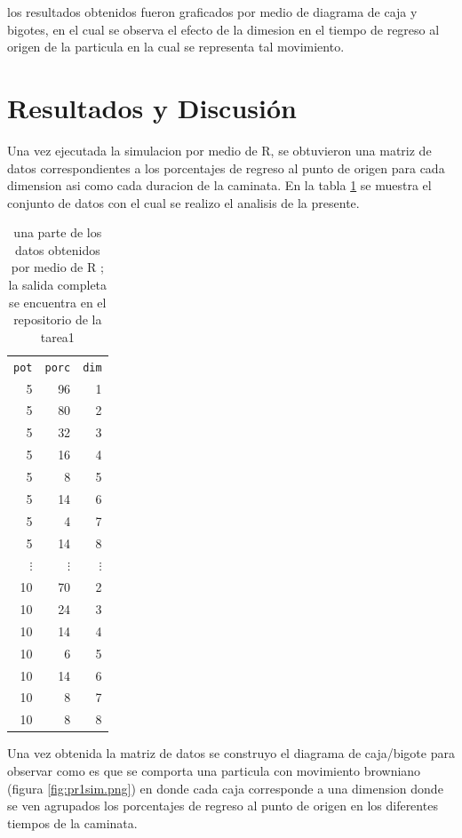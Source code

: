 \documentclass{article}
\begin{document}
los resultados obtenidos fueron graficados por medio de diagrama de caja y bigotes, en el cual se observa el efecto de la dimesion en el tiempo de regreso al origen de la particula en la cual se representa tal movimiento.

\section{Resultados y Discusi\'on}\label{res}

Una vez ejecutada la simulacion por medio de R, se obtuvieron una matriz de datos correspondientes a los porcentajes de regreso al punto de origen para cada dimension asi como cada duracion de la caminata. En la tabla \ref{t1} se muestra el conjunto de datos con el cual se realizo el analisis de la presente.

\begin{table} 
\caption{una parte de los datos obtenidos por medio de R ; la salida completa se encuentra en el repositorio de la tarea1}
\label{t1}
\begin{center}
\begin{tabular}{rrr}
\texttt{pot} & \texttt{porc} & \texttt{dim} \\
5  &  96  &  1 \\
5  &  80  &  2 \\
5  &  32  &  3 \\
5  &  16  &  4 \\
5  &  8    &   5 \\
5  &  14  &   6 \\
5  &  4    &   7 \\
5  &  14  &   8 \\
$\vdots$ &   $\vdots$ &   $\vdots$ \\
10  &   70  &  2 \\
10  &  24   &  3 \\
10  &  14   &  4 \\
10  &   6    &  5 \\
10  &  14   &  6 \\
10  &  8     &  7 \\
10  &  8     &  8 \\
\end{tabular}
\end{center}
\end{table}

Una vez obtenida la matriz de datos se construyo el diagrama de caja/bigote para observar como es que se comporta una particula con movimiento browniano (figura \ref{fig:pr1sim.png}) en donde cada caja corresponde a una dimension donde se ven agrupados los porcentajes de regreso al punto de origen en los diferentes tiempos de la caminata.
\end{document}
